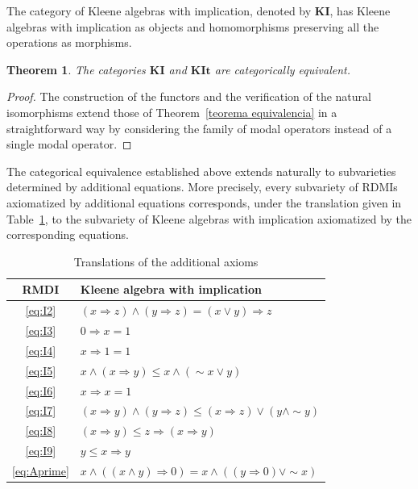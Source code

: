 \documentclass{article}
\newtheorem{theorem}{Theorem}[section]
\begin{document}
The category of Kleene algebras with implication, denoted by $\mathbf{KI}$, has Kleene algebras with implication as objects and homomorphisms preserving all the operations as morphisms.

\begin{theorem}
The categories $\mathbf{KI}$ and $\mathbf{KIt}$ are categorically equivalent.
\end{theorem}
\begin{proof}
    The construction of the functors and the verification of the natural isomorphisms extend those of Theorem~\ref{teorema equivalencia} in a straightforward way by considering the family of modal operators instead of a single modal operator.
\end{proof}

The categorical equivalence established above extends naturally to subvarieties determined by additional equations. More precisely, every subvariety of RDMIs axiomatized by additional equations corresponds, under the translation given in Table~\ref{tab:rdmi-kleene}, to the subvariety of Kleene algebras with implication axiomatized by the corresponding equations.

\begin{table}[ht]
\centering
\small
\renewcommand{\arraystretch}{1.5}
\begin{tabular}{|c|l|}
\hline
RMDI& Kleene algebra with implication \\
\hline
    \eqref{eq:I2} &
$(x\Rightarrow z)\wedge(y\Rightarrow z)=(x\vee y)\Rightarrow z$
\\
\hline
\eqref{eq:I3} &
$0\Rightarrow x=1$
\\
\hline
\eqref{eq:I4} &
$x\Rightarrow1=1$
\\
\hline
\eqref{eq:I5} &
$x\wedge(x\Rightarrow y)\le x\wedge(\sim x\vee y)$
\\
\hline
\eqref{eq:I6} &
$x\Rightarrow x=1$
\\
\hline
\eqref{eq:I7} &
$(x\Rightarrow y)\wedge(y\Rightarrow z)
\le
(x\Rightarrow z)\vee(y\wedge\sim y)$
\\
\hline
\eqref{eq:I8} &
$(x\Rightarrow y)\le z\Rightarrow(x\Rightarrow y)$
\\
\hline
\eqref{eq:I9} &
$ y\le x\Rightarrow y$
\\
\hline
\eqref{eq:Aprime} &
$x\wedge((x\wedge y)\Rightarrow 0)= x\wedge(( y\Rightarrow 0)\vee \sim x)$
\\
\hline
\end{tabular}
\caption{Translations of the additional axioms}
\label{tab:rdmi-kleene}
\end{table}
\end{document}
